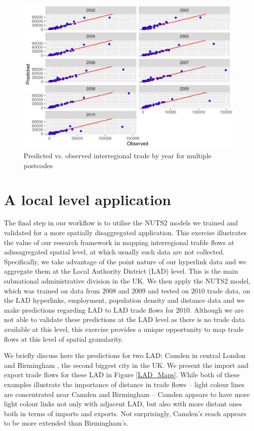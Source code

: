 \documentclass[]{interact}
\theoremstyle{plain}%
\theoremstyle{definition}
\theoremstyle{remark}
\begin{document}
\begin{figure}[p]
\includegraphics[width=1\linewidth]{hl_files/figure-latex/unnamed-chunk-13-1} \caption{\label{prediction_multi_pc}Predicted vs. observed interregional trade by year for multiple postcodes}\label{fig:unnamed-chunk-13}
\end{figure}

\hypertarget{a-local-level-application}{%
\section{A local level application}\label{a-local-level-application}}

The final step in our workflow is to utilise the NUTS2 models we trained
and validated for a more spatially disaggregated application. This
exercise illustrates the value of our research framework in mapping
interregional trafde flows at adissagregated spatial level, at which
usually such data are not collected. Specifically, we take advantage of
the point nature of our hyperlink data and we aggregate them at the
Local Authority District (LAD) level. This is the main subnational
administrative division in the UK. We then apply the NUTS2 model, which
was trained on data from \(2008\) and \(2009\) and tested on \(2010\)
trade data, on the LAD hyperlinks, employment, population density and
distance data and we make predictions regarding LAD to LAD trade flows
for \(2010\). Although we are not able to validate these predictions at
the LAD level as there is no trade data available at this level, this
exercise provides a unique opportunity to map trade flows at this level
of spatial granularity.

We briefly discuss here the predictions for two LAD: Camden in central
London and Birmingham , the second biggest city in the UK. We present
the import and export trade flows for these LAD in Figure
\ref{LAD_Maps}. While both of these examples illustrate the importance
of distance in trade flows -- light colour lines are concentrated near
Camden and Birmingham -- Camden appears to have more light colour links
not only with adjacent LAD, but also with more distant ones both in
terms of imports and exports. Not surprisingly, Camden's reach appears
to be more extended than Birmingham's.
\end{document}
